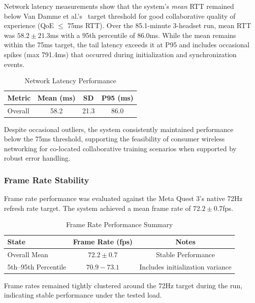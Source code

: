 \documentclass[conference]{IEEEtran}
\begin{document}
Network latency measurements show that the system's \emph{mean} RTT remained below Van Damme et al.'s~\cite{VanDammeSam2024Iolo} target threshold for good collaborative quality of experience (QoE $\leq$ 75ms RTT). Over the 85.1-minute 3-headset run, mean RTT was $58.2 \pm 21.3$ms with a 95th percentile of 86.0ms. While the mean remains within the 75ms target, the tail latency exceeds it at P95 and includes occasional spikes (max 791.4ms) that occurred during initialization and synchronization events.

\begin{table}[h]
\centering
\caption{Network Latency Performance}
\begin{tabular}{|l|c|c|c|}
\hline
                    	\textbf{Metric} & \textbf{Mean (ms)} & \textbf{SD} & \textbf{P95 (ms)} \\
\hline
Overall & 58.2 & 21.3 & 86.0 \\
\hline
\end{tabular}
\end{table}

Despite occasional outliers, the system consistently maintained performance below the 75ms threshold, supporting the feasibility of consumer wireless networking for co-located collaborative training scenarios when supported by robust error handling.

\subsubsection{Frame Rate Stability}

Frame rate performance was evaluated against the Meta Quest 3's native 72Hz refresh rate target. The system achieved a mean frame rate of $72.2 \pm 0.7$fps. 

\begin{table}[h]
\centering
\caption{Frame Rate Performance Summary}
\begin{tabular}{|l|c|c|}
\hline
\textbf{State} & \textbf{Frame Rate (fps)} & \textbf{Notes} \\
\hline
Overall Mean & $72.2 \pm 0.7$ & Stable Performance \\
5th--95th Percentile & $70.9 - 73.1$ & Includes initialization variance \\
\hline
\end{tabular}
\end{table}

Frame rates remained tightly clustered around the 72Hz target during the run, indicating stable performance under the tested load.
\end{document}

